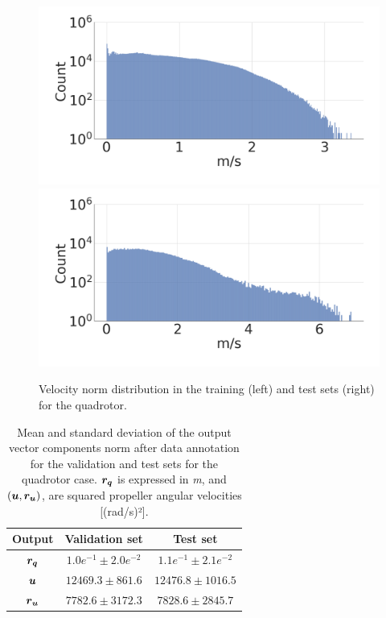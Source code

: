 \begin{figure} [htp]
    \centering
    \includegraphics[width=0.49\linewidth]{figures/learning_quadrotor/vnorm_val2.png}
    \includegraphics[width=0.49\linewidth]{figures/learning_quadrotor/vnorm_test.png}
    \caption{Velocity norm distribution in the training (left) and test sets (right) for the quadrotor.}%
    \label{fig: valvstest}%
\end{figure}

\begin{table}[htp]
    \centering
    \begin{tabular}{ | c | c || c |}
    \hline
      \textbf{Output}  & \textbf{Validation set}  & \textbf{Test set} \\ \hline
    $\boldsymbol{r_q}$ & $1.0e^{-1} \pm 2.0e^{-2}$ & $1.1e^{-1} \pm 2.1e^{-2}$ \\ \hline
    $\boldsymbol{u}$ & $12469.3 \pm 861.6$ & $12476.8 \pm 1016.5$ \\ \hline
    $\boldsymbol{r_u}$ & $7782.6 \pm 3172.3$ & $7828.6 \pm 2845.7$ \\ \hline
\end{tabular}
\caption{
Mean and standard deviation of the output vector components norm after data annotation for the validation and test sets for the quadrotor case.
$\boldsymbol{r_q}$ is expressed in \emph{m}, and $(\boldsymbol{u}, \boldsymbol{r_u})$, are squared propeller angular velocities [(rad/s)²].}
 \label{tab:datas_stats}
\end{table}


